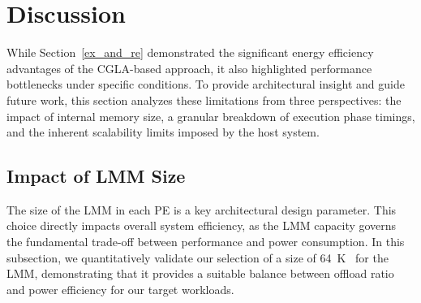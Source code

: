 \section{Discussion}
\label{discussion}


While Section~\ref{ex_and_re}  demonstrated the significant energy efficiency advantages of the CGLA-based approach, it also highlighted performance bottlenecks under specific conditions. 
To provide architectural insight and guide future work, this section analyzes these limitations from three perspectives: the impact of internal memory size, a granular breakdown of execution phase timings, and the inherent scalability limits imposed by the host system.
\subsection{Impact of LMM Size}
The size of the LMM in each PE is a key architectural design parameter.
This choice directly impacts overall system efficiency, as the LMM capacity governs the fundamental trade-off between performance and power consumption. 
In this subsection, we quantitatively validate our selection of a size of \SI{64}{K\byte} for the LMM, demonstrating that it provides a suitable balance between offload ratio and power efficiency for our target workloads.





